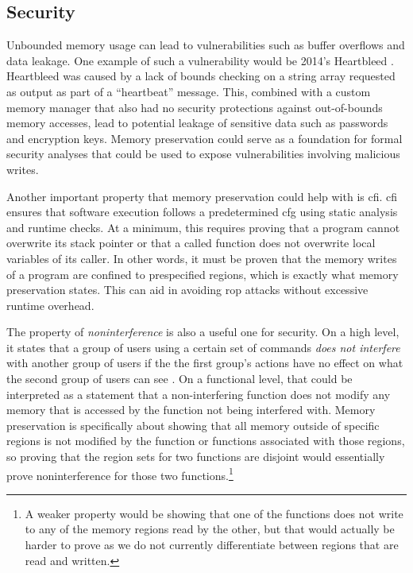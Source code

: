 \subsection{Security}
Unbounded memory usage can lead to vulnerabilities
such as buffer overflows and data leakage.
One example of such a vulnerability would be 2014's Heartbleed \autocite{heartbleed}.
Heartbleed was caused by a lack of bounds checking on a string array
requested as output as part of a ``heartbeat'' message.
This, combined with a custom memory manager
that also had no security protections against out-of-bounds memory accesses,
lead to potential leakage of sensitive data such as passwords and encryption keys.
Memory preservation could serve as a foundation for formal security analyses
that could be used to expose vulnerabilities involving malicious writes.

Another important property that memory preservation could help with
is \ac{cfi}. \Ac{cfi} ensures that software execution
follows a predetermined \ac{cfg} using static analysis and runtime checks.
At a minimum, this requires proving that a program cannot overwrite its stack pointer
or that a called function does not overwrite local variables of its caller.
In other words, it must be proven that the memory writes of a program
are confined to prespecified regions, which is exactly what memory preservation states.
This can aid in avoiding \ac{rop} attacks without excessive runtime overhead.

The property of \emph{noninterference} is also a useful one for security.
On a high level, it states that a group of users using a certain set of commands
\emph{does not interfere} with another group of users if the the first group's actions
have no effect on what the second group of users can see
\autocite{goguen1982security,rushby1992noninterference}.
On a functional level, that could be interpreted as a statement that a non-interfering function does not modify any memory that is accessed
by the function not being interfered with.
Memory preservation is specifically about showing that all memory outside of
specific regions is not modified by the function
or functions associated with those regions, so proving that the region sets
for two functions are disjoint
would essentially prove noninterference for those two functions.\footnote{%
  A weaker property would be showing that one of the functions does not write
  to any of the memory regions read by the other, but that would actually be harder to prove
  as we do not currently differentiate between regions that are read and written.%
}


